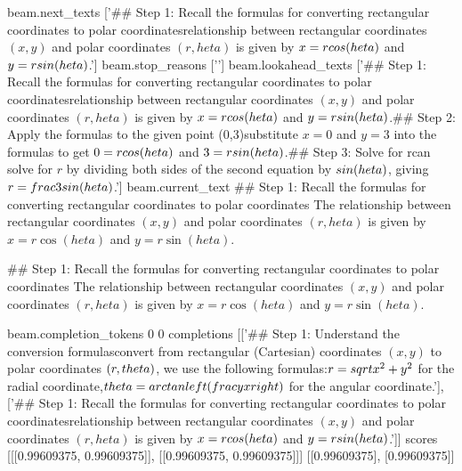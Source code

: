 beam.next_texts
['## Step 1: Recall the formulas for converting rectangular coordinates to polar coordinates\nThe relationship between rectangular coordinates $(x,y)$ and polar coordinates $(r,heta)$ is given by $x = r\\cos(heta)$ and $y = r\\sin(heta)$.\n\n']
beam.stop_reasons
['\n\n']
beam.lookahead_texts
['## Step 1: Recall the formulas for converting rectangular coordinates to polar coordinates\nThe relationship between rectangular coordinates $(x,y)$ and polar coordinates $(r,heta)$ is given by $x = r\\cos(heta)$ and $y = r\\sin(heta)$.\n\n## Step 2: Apply the formulas to the given point (0,3)\nWe substitute $x = 0$ and $y = 3$ into the formulas to get $0 = r\\cos(heta)$ and $3 = r\\sin(heta)$.\n\n## Step 3: Solve for r\nWe can solve for $r$ by dividing both sides of the second equation by $\\sin(heta)$, giving $r = \\frac{3}{\\sin(heta)}$.\n\n']
beam.current_text
## Step 1: Recall the formulas for converting rectangular coordinates to polar coordinates
The relationship between rectangular coordinates $(x,y)$ and polar coordinates $(r,heta)$ is given by $x = r\cos(heta)$ and $y = r\sin(heta)$.


## Step 1: Recall the formulas for converting rectangular coordinates to polar coordinates
The relationship between rectangular coordinates $(x,y)$ and polar coordinates $(r,heta)$ is given by $x = r\cos(heta)$ and $y = r\sin(heta)$.


beam.completion_tokens
0
0
completions
[['## Step 1: Understand the conversion formulas\nTo convert from rectangular (Cartesian) coordinates $(x, y)$ to polar coordinates $(r, \\theta)$, we use the following formulas:\n$r = \\sqrt{x^2 + y^2}$ for the radial coordinate,\n$\\theta = \\arctan\\left(\\frac{y}{x}\\right)$ for the angular coordinate.\n\n'], ['## Step 1: Recall the formulas for converting rectangular coordinates to polar coordinates\nThe relationship between rectangular coordinates $(x,y)$ and polar coordinates $(r,heta)$ is given by $x = r\\cos(heta)$ and $y = r\\sin(heta)$.\n\n']]
scores
[[[0.99609375, 0.99609375]], [[0.99609375, 0.99609375]]]
[[0.99609375], [0.99609375]]

